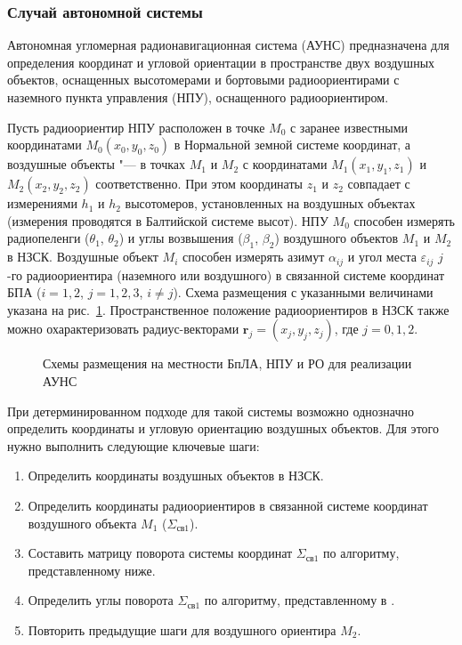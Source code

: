 \documentclass[../main.tex]{subfiles}
\begin{document}
\subsubsection{Случай автономной системы}
Автономная угломерная радионавигационная система (АУНС) предназначена для определения координат и угловой ориентации в пространстве двух воздушных объектов, оснащенных высотомерами и бортовыми радиоориентирами с наземного пункта управления (НПУ), оснащенного радиоориентиром.

Пусть радиоориентир НПУ расположен в точке $M_0$ с заранее известными координатами $M_0\left(x_0, y_0, z_0\right)$ в Нормальной земной системе координат, а воздушные объекты "--- в точках $M_1$ и $M_2$ с координатами $M_1\left(x_1, y_1, z_1\right)$ и $M_2\left(x_2, y_2, z_2\right)$ соответственно. При этом координаты $z_1$ и $z_2$ совпадает с измерениями $h_1$ и $h_2$ высотомеров, установленных на воздушных объектах (измерения проводятся в Балтийской системе высот). НПУ $M_0$ способен измерять радиопеленги ($\theta_1$, $\theta_2$) и углы возвышения ($\beta_1$, $\beta_2$) воздушного объектов $M_1$ и $M_2$ в НЗСК. Воздушные объект $M_i$ способен измерять азимут $\alpha_{ij}$ и угол места $\varepsilon_{ij}$ $j$-го радиоориентира (наземного или воздушного) в связанной системе координат БПА ($i = 1,2$, $j = 1,2,3$, $i \ne j$). Схема размещения с указанными величинами указана на рис.~\ref{fig:systems:pic3}. Пространственное положение радиоориентиров в НЗСК также можно охарактеризовать радиус-векторами $\mathbf{r}_j = \left(x_j, y_j, z_j\right)$, где $j = 0,1,2$.

\begin{figure}[htbp]
    \begin{center}


    \caption{Схемы размещения на местности БпЛА, НПУ и РО для реализации АУНС}
    \label{fig:systems:pic3}
    \end{center}
\end{figure}

При детерминированном подходе для такой системы возможно однозначно определить координаты и угловую ориентацию воздушных объектов. Для этого нужно выполнить следующие ключевые шаги:
\begin{enumerate}
    \item Определить координаты воздушных объектов в НЗСК.
    \item Определить координаты радиоориентиров в связанной системе координат воздушного объекта $M_1$ ($\Sigma_{\text{св}1}$).
    \item Составить матрицу поворота системы координат $\Sigma_{\text{св}1}$ по алгоритму, представленному ниже.
    \item Определить углы поворота $\Sigma_{\text{св}1}$ по алгоритму, представленному в \cite{antennas}.
    \item Повторить предыдущие шаги для воздушного ориентира $M_2$.
\end{enumerate}
\end{document}

